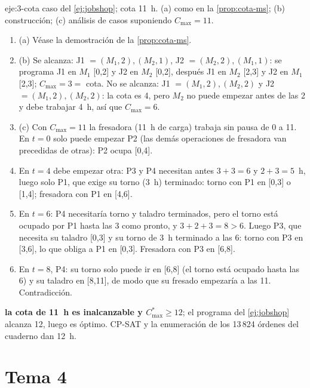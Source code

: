 \begin{solucion}{eje:3-cota}
\datos caso del \cref{ej:jobshop}; cota 11~h.
\planteamiento (a) como en la \cref{prop:cota-ms}; (b) construcción; (c) análisis de casos suponiendo $C_{\max}=11$.
\pasos
\begin{enumerate}[label=\arabic*.]
  \item (a) Véase la demostración de la \cref{prop:cota-ms}.
  \item (b) Se alcanza: J1 $=(M_1,2),(M_2,1)$, J2 $=(M_2,2),(M_1,1)$: se programa J1 en $M_1$ [0,2] y J2 en $M_2$ [0,2], después J1 en $M_2$ [2,3] y J2 en $M_1$ [2,3]; $C_{\max}=3=$ cota. No se alcanza: J1 $=(M_1,2),(M_2,2)$ y J2 $=(M_1,2),(M_2,2)$: la cota es 4, pero $M_2$ no puede empezar antes de las 2 y debe trabajar 4~h, así que $C_{\max}=6$.
  \item (c) Con $C_{\max}=11$ la fresadora (11~h de carga) trabaja sin pausa de 0 a 11. En $t=0$ solo puede empezar P2 (las demás operaciones de fresadora van precedidas de otras): P2 ocupa [0,4].
  \item En $t=4$ debe empezar otra: P3 y P4 necesitan antes $3+3=6$ y $2+3=5$~h, luego solo P1, que exige su torno (3~h) terminado: torno con P1 en [0,3] o [1,4]; fresadora con P1 en [4,6].
  \item En $t=6$: P4 necesitaría torno y taladro terminados, pero el torno está ocupado por P1 hasta las 3 como pronto, y $3+2+3=8>6$. Luego P3, que necesita su taladro [0,3] y su torno de 3~h terminado a las 6: torno con P3 en [3,6], lo que obliga a P1 en [0,3]. Fresadora con P3 en [6,8].
  \item En $t=8$, P4: su torno solo puede ir en [6,8] (el torno está ocupado hasta las 6) y su taladro en [8,11], de modo que su fresado empezaría a las 11. Contradicción.
\end{enumerate}
\resultado \textbf{la cota de 11~h es inalcanzable y $C_{\max}^{*}\ge 12$}; el programa del \cref{ej:jobshop} alcanza 12, luego es óptimo.
\comprobacion CP-SAT y la enumeración de los 13\,824 órdenes del cuaderno dan 12~h.
\end{solucion}

\section{Tema 4}

